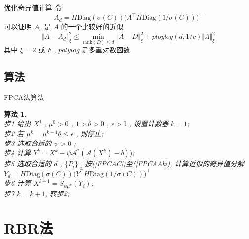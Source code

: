 \documentclass[slidestop, compress, mathserif, UTF8]{beamer}
\newtheorem{algo}{\bf \textcolor[rgb]{0.8,0,0}{算法}}
\numberwithin{equation}{section}                                        %
\begin{document}
			\begin{frame}[t]{优化奇异值计算}
				令
				\begin{equation}\label{FPCAAk}
						A_d
					=	H \text{Diag}(\sigma(C)) \big(A ^\top H \text{Diag}(1/\sigma(C))\big)^\top
				\end{equation}
				可以证明 $A_d$ 是 $A$ 的一个比较好的近似
				\begin{equation}
						\Vert{A - A_d}\Vert^2_\xi 
					\le	\min_{\text{rank}(D) \le d} \Vert{A - D}\Vert^2_\xi + ploylog(d, 1/c) \Vert{A}\Vert^2_\xi
				\end{equation}
				其中 $\xi = 2 \text{ 或 } F$ , $polylog$ 是多重对数函数.
			\end{frame}
		\subsection{算法}
			\begin{frame}[t]{FPCA法算法}
				\begin{algo}
					\quad\\
					步1 \quad 给出 $X^1$ , $\mu^0 > 0$ , $1 > \theta > 0$ , $\epsilon > 0$ , 设置计数器 $k = 1$;\\
					步2 \quad 若 $\mu^k = \mu^{k -1} \theta \le \epsilon$ , 则停止;\\
					步3 \quad 选取合适的 $\psi > 0$ ;\\
					步4 \quad 计算 $Y^k = X^k - \psi \mathcal{A}^*(\mathcal{A}(X^k) - b))$;\\
					步5 \quad 选取合适的 $d$ , $\{P_i\}$ , 按(\ref{FPCAC})至(\ref{FPCAAk}), 计算近似的奇异值分解 $Y_d = H \text{Diag}(\sigma(C)) \big(Y ^\top H \text{Diag}(1/\sigma(C))\big)^\top$\\
					步6 \quad 计算 $X^{k + 1} = S_{\psi \mu^k}(Y_d)$;\\
					步7 \quad $k = k + 1$, 转步2;
				\end{algo}
			\end{frame}
	\section{RBR法}\label{section3}
\end{document}
